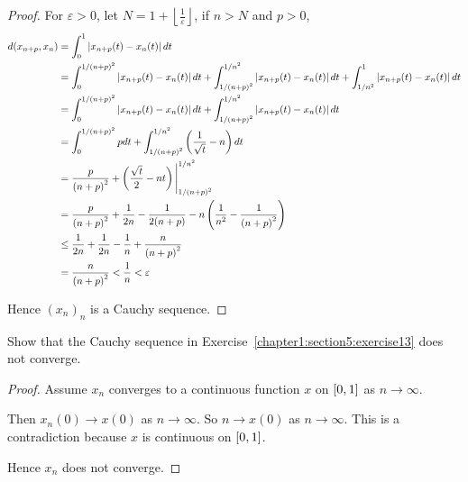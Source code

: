 \begin{proof}
    For $\varepsilon > 0$, let $N = 1 + \left\lfloor\frac{1}{\varepsilon}\right\rfloor$, if $n > N$ and $p > 0$,
    \begin{align*}
        d(x_{n+p}, x_{n}) & = \int^{1}_{0}\left\vert{x_{n+p}(t) - x_{n}(t)}\right\vert dt                                                                                                                             \\
                          & = \int^{1/{(n+p)}^{2}}_{0}\left\vert{x_{n+p}(t) - x_{n}(t)}\right\vert dt + \int^{1/n^{2}}_{1/{(n+p)}^{2}}\left\vert{x_{n+p}(t) - x_{n}(t)}\right\vert dt + \int^{1}_{1/n^{2}}\left\vert{x_{n+p}(t) - x_{n}(t)}\right\vert dt \\
                          & = \int^{1/{(n+p)}^{2}}_{0}\left\vert{x_{n+p}(t) - x_{n}(t)}\right\vert dt + \int^{1/n^{2}}_{1/{(n+p)}^{2}}\left\vert{x_{n+p}(t) - x_{n}(t)}\right\vert dt                                                   \\
                          & =  \int^{1/{(n+p)}^{2}}_{0}pdt + \int^{1/n^{2}}_{1/{(n+p)}^{2}}\left(\frac{1}{\sqrt{t}} - n\right)dt                                                                    \\
                          & = \frac{p}{{(n+p)}^{2}} + \left(\frac{\sqrt{t}}{2} - nt\right)\Biggl{\vert}^{1/n^{2}}_{1/{{(n+p)}^{2}}}                                                                 \\
                          & = \frac{p}{{(n+p)}^{2}} + \frac{1}{2n} - \frac{1}{2(n+p)} - n\left(\frac{1}{n^{2}} - \frac{1}{{(n+p)}^{2}}\right)                                                       \\
                          & \leq \frac{1}{2n} + \frac{1}{2n} - \frac{1}{n} + \frac{n}{{(n+p)}^{2}}                                                                                                  \\
                          & = \frac{n}{{(n+p)}^{2}} < \frac{1}{n} < \varepsilon
    \end{align*}

    Hence ${(x_{n})}_{n}$ is a Cauchy sequence.
\end{proof}

\begin{exercise}\label{chapter1:section5:exercise14}
    Show that the Cauchy sequence in Exercise~\ref{chapter1:section5:exercise13} does not converge.
\end{exercise}

\begin{proof}
    Assume $x_{n}$ converges to a continuous function $x$ on $\left[{0, 1}\right]$ as $n\to\infty$.

    Then $x_{n}(0)\to x(0)$ as $n\to\infty$. So $n\to x(0)$ as $n\to\infty$. This is a contradiction because $x$ is continuous on $\left[{0, 1}\right]$.

    Hence $x_{n}$ does not converge.
\end{proof}

